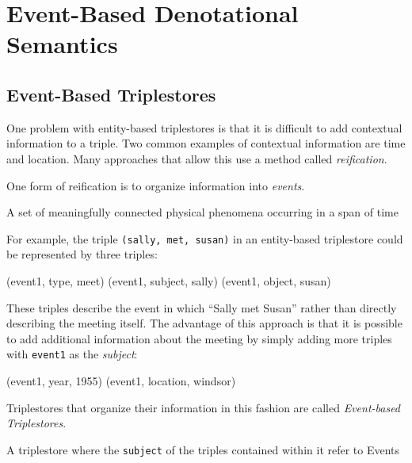 \documentclass[../main.tex]{subfiles}
\begin{document}
	
\setlength{\abovedisplayskip}{0pt}
\setlength{\belowdisplayskip}{12pt}
\setlength{\abovedisplayshortskip}{0pt}
\setlength{\belowdisplayshortskip}{0pt} 

\chapter {Event-Based Denotational Semantics}

\section{Event-Based Triplestores}

One problem with entity-based triplestores is that it is difficult to add contextual information to a triple.  Two common examples of contextual information are time and location.  Many approaches that allow this use a method called {\em reification}\cite{?}.

One form of reification is to organize information into {\em events}.

\begin{definition}[Event]
	A set of meaningfully connected physical phenomena occurring in a span of time
\end{definition}

For example, the triple \texttt{(sally, met, susan)} in an entity-based triplestore could be represented by three triples:

\begin{code}
	(event1, type, meet)
	(event1, subject, sally)
	(event1, object, susan)
\end{code}

These triples describe the event in which ``Sally met Susan'' rather than directly describing the meeting itself.  The advantage of this approach is that it is possible to add additional information about the meeting by simply adding more triples with \texttt{event1} as the {\em subject}:

\begin{code}
	(event1, year, 1955)
	(event1, location, windsor)
\end{code}

Triplestores that organize their information in this fashion are called {\em Event-based Triplestores}.

\begin{definition}
	A triplestore where the \texttt{subject} of the triples contained within it refer to Events\cite{frostagboola2014}
\end{definition}
\end{document}
